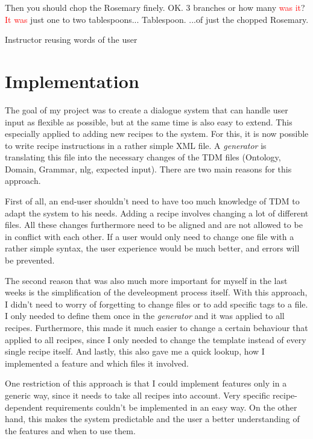 \documentclass[
	11pt, %
]{fphw}
\newenvironment{captionedDialogue}
    {\captionsetup{
        type=Dialogue,
        skip=2pt,
        belowskip=15pt
        }
    }
    {}
\newenvironment{mydialogue}
    {\begin{snugshade}
     \hrulefill
     \begin{dialogue}}
    {\end{dialogue}
     \hrulefill
     \end{snugshade}}
\begin{document}
\begin{captionedDialogue}
    \begin{mydialogue}
         Then you should chop the Rosemary finely.
         OK. 3 branches or how many \textcolor{red}{was it}? 
         \textcolor{red}{It was} just one to two tablespoons... 
         Tablespoon. 
         ...of just the chopped Rosemary.
    \end{mydialogue}
    \caption{Instructor reusing words of the user}
    \label{dia:user_language}
\end{captionedDialogue}


\section*{Implementation}
The goal of my project was to create a dialogue system that can handle user input as flexible as possible, but at the same time is also easy to extend. This especially applied to adding new recipes to the system. For this, it is now possible to write recipe instructions in a rather simple XML file. A \emph{generator} is translating this file into the necessary changes of the TDM files (Ontology, Domain, Grammar, nlg, expected input). There are two main reasons for this approach. 

First of all, an end-user shouldn't need to have too much knowledge of TDM to adapt the system to his needs. Adding a recipe involves changing a lot of different files. All these changes furthermore need to be aligned and are not allowed to be in conflict with each other. If a user would only need to change one file with a rather simple syntax, the user experience would be much better, and errors will be prevented.

The second reason that was also much more important for myself in the last weeks is the simplification of the develeopment process itself. With this approach, I didn't need to worry of forgetting to change files or to add specific tags to a file. I only needed to define them once in the \emph{generator} and it was applied to all recipes. Furthermore, this made it much easier to change a certain behaviour that applied to all recipes, since I only needed to change the template instead of every single recipe itself. And lastly, this also gave me a quick lookup, how I implemented a feature and which files it involved.

One restriction of this approach is that I could implement features only in a generic way, since it needs to take all recipes into account. Very specific recipe-dependent requirements couldn't be implemented in an easy way. On the other hand, this makes the system predictable and the user a better understanding of the features and when to use them.
\end{document}
